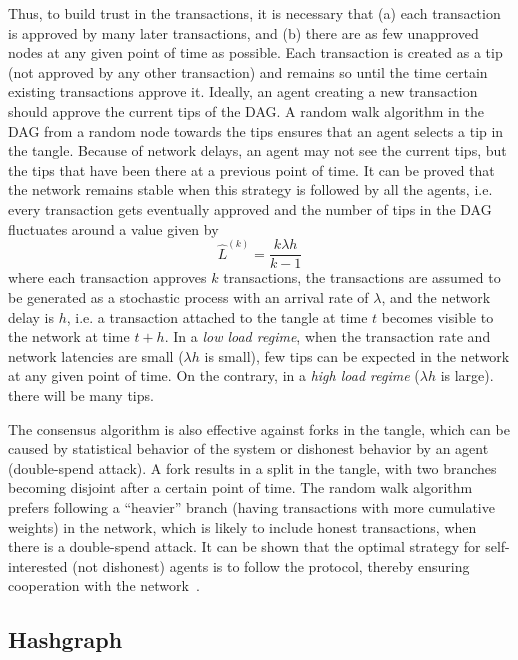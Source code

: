 Thus, to build trust in the transactions, it is necessary that (a) each transaction is approved by many later transactions, and (b) 
there are as few unapproved nodes at any given point of time as possible. Each transaction is created as a tip (not approved by any 
other transaction) and remains so until the time certain existing transactions approve it. Ideally, an agent creating a new transaction 
should approve the current tips of the DAG. A random walk algorithm in the DAG from a random node towards the tips ensures that an
agent selects a tip in the tangle. 
%
Because of network delays, an agent may not see the current tips, but the tips that have been there at a previous point of time.
It can be proved that the network remains stable when this strategy is followed by all the agents, i.e. every transaction gets 
eventually approved and the number of tips in the DAG fluctuates around a value given by
\begin{equation}
	\hat{L}^{(k)} = \frac{k \lambda h}{k - 1}
\end{equation}
\noindent
where each transaction approves $k$ transactions, the transactions are assumed to be generated as a stochastic process with an arrival 
rate of $\lambda$, and the network delay is $h$, i.e. a transaction attached to the tangle at time $t$ becomes visible to the 
network at time $t + h$. 
%
In a {\em low load regime}, when the transaction rate and network latencies are small ($\lambda h$ is small), few tips can be expected
in the network at any given point of time. On the contrary, in a {\em high load regime} ($\lambda h$ is large). there will be many tips.
 
The consensus algorithm is also effective against forks in the tangle, which can be caused by statistical behavior of the system or 
dishonest behavior by an agent (double-spend attack). A fork results in a split in the tangle, with two branches becoming disjoint 
after a certain point of time. The random walk algorithm prefers following a ``heavier'' branch (having transactions with more 
cumulative weights) in the network, which is likely to include honest transactions, when there is a double-spend attack. It can be 
shown that the optimal strategy for self-interested (not dishonest) agents is to follow the protocol, thereby ensuring cooperation 
with the network~\cite{Popov:2019}. 


\subsection{Hashgraph}

